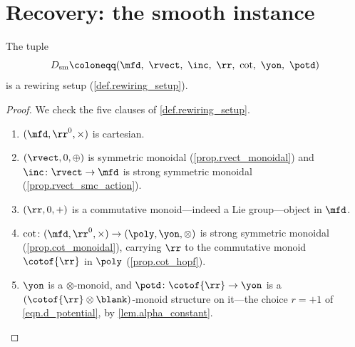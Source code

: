 \section{Recovery: the smooth instance}\label{sec.recovery_DRAFT}


\begin{proposition}\label{prop.smooth_setup}
The tuple
\[
  D_{\mathrm{sm}}\coloneqq(\mfd,\ \rvect,\ \inc,\ \rr,\ \cot,\ \yon,\ \potd)
\]
is a rewiring setup (\cref{def.rewiring_setup}).
\end{proposition}

\begin{proof}
We check the five clauses of \cref{def.rewiring_setup}.
\begin{enumerate}
  \item $(\mfd,\rr^0,\times)$ is cartesian.
  \item $(\rvect,0,\oplus)$ is symmetric monoidal (\cref{prop.rvect_monoidal}) and
    $\inc\colon\rvect\to\mfd$ is strong symmetric monoidal
    (\cref{prop.rvect_smc_action}).
  \item $(\rr,0,+)$ is a commutative monoid---indeed a Lie group---object in $\mfd$.
  \item $\cot\colon(\mfd,\rr^0,\times)\to(\poly,\yon,\otimes)$ is strong symmetric
    monoidal (\cref{prop.cot_monoidal}), carrying $\rr$ to the commutative monoid
    $\cotof{\rr}$ in $\poly$ (\cref{prop.cot_hopf}).
  \item $\yon$ is a $\otimes$-monoid, and $\potd\colon\cotof{\rr}\to\yon$ is a
    $(\cotof{\rr}\otimes\blank)$-monoid structure on it---the choice $r=+1$ of
    \eqref{eqn.d_potential}, by \cref{lem.alpha_constant}.
    \qedhere
\end{enumerate}
\end{proof}

